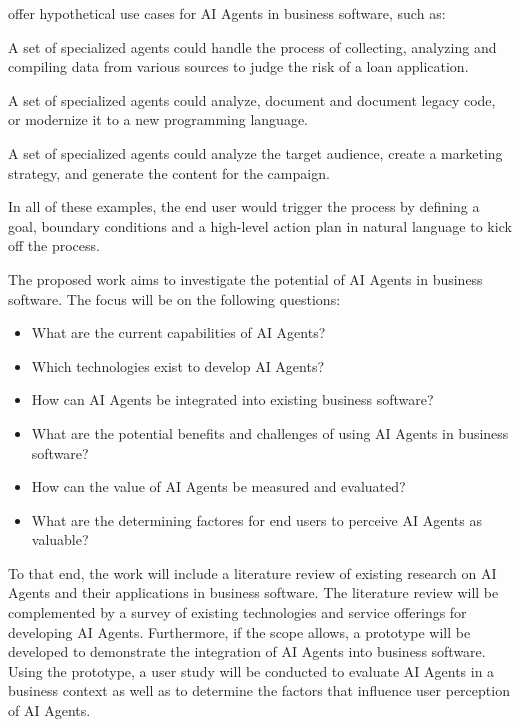 \documentclass[
  paper=a4,
  parskip=half,
  fontsize=12pt,
  listof=toc,
  titlepage,
  headsepline,
  footsepline,
]{scrartcl}
\begin{document}
\cite{mckinsey_why-ai-agents} offer hypothetical use cases for AI Agents in business software, such as:
\begin{description}[font=\small\bfseries]
  \item[Loan underwriting] A set of specialized agents could handle the process of collecting, analyzing and compiling data from various sources to judge the risk of a loan application.
  \item[Code documentation and modernization] A set of specialized agents could analyze, document and document legacy code, or modernize it to a new programming language.
  \item[Online marketing capaign creation] A set of specialized agents could analyze the target audience, create a marketing strategy, and generate the content for the campaign.
\end{description}
In all of these examples, the end user would trigger the process by defining a goal, boundary conditions and a high-level action plan in natural language to kick off the process.

The proposed work aims to investigate the potential of AI Agents in business software.
The focus will be on the following questions:

\begin{itemize}
  \item What are the current capabilities of AI Agents?
  \item Which technologies exist to develop AI Agents?
  \item How can AI Agents be integrated into existing business software?
  \item What are the potential benefits and challenges of using AI Agents in business software?
  \item How can the value of AI Agents be measured and evaluated?
  \item What are the determining factores for end users to perceive AI Agents as valuable?
\end{itemize}

To that end, the work will include a literature review of existing research on AI Agents and their applications in business software.
The literature review will be complemented by a survey of existing technologies and service offerings for developing AI Agents.
Furthermore, if the scope allows, a prototype will be developed to demonstrate the integration of AI Agents into business software.
Using the prototype, a user study will be conducted to evaluate AI Agents in a business context as well as to determine the factors that influence user perception of AI Agents.
\end{document}
